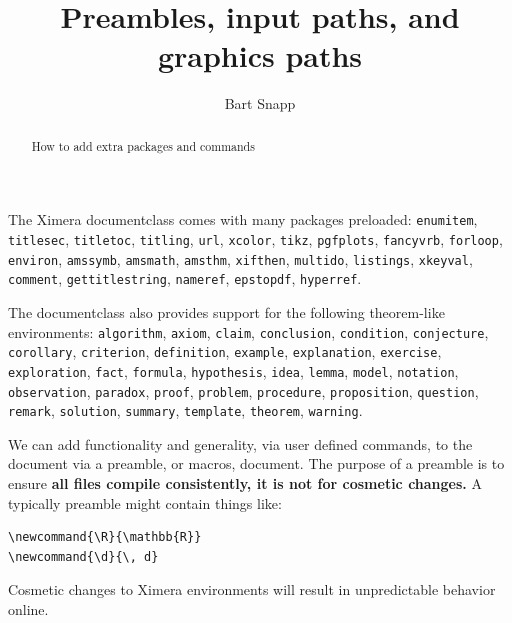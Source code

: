 \documentclass{ximera}
\title{Preambles, input paths, and graphics paths}
\author{Bart Snapp}
\begin{document}
\begin{abstract}
  How to add extra packages and commands
\end{abstract}
\maketitle



The Ximera documentclass comes with many packages preloaded:
\verb!enumitem!, 
\verb!titlesec!, 
\verb!titletoc!, 
\verb!titling!, 
\verb!url!, 
\verb!xcolor!, 
\verb!tikz!, 
\verb!pgfplots!, 
\verb!fancyvrb!, 
\verb!forloop!, 
\verb!environ!, 
\verb!amssymb!, 
\verb!amsmath!, 
\verb!amsthm!, 
\verb!xifthen!, 
\verb!multido!, 
\verb!listings!, 
\verb!xkeyval!, 
\verb!comment!, 
\verb!gettitlestring!, 
\verb!nameref!, 
\verb!epstopdf!, 
\verb!hyperref!.

The documentclass also provides support for the following theorem-like
environments:
\verb!algorithm!, \verb!axiom!, \verb!claim!, \verb!conclusion!,
\verb!condition!, \verb!conjecture!, \verb!corollary!, \verb!criterion!,
\verb!definition!, \verb!example!, \verb!explanation!, \verb!exercise!,
\verb!exploration!,
\verb!fact!, \verb!formula!, \verb!hypothesis!, \verb!idea!, \verb!lemma!,
\verb!model!,
\verb!notation!, \verb!observation!, \verb!paradox!, \verb!proof!, \verb!problem!,
\verb!procedure!,
\verb!proposition!, \verb!question!, \verb!remark!, \verb!solution!,
\verb!summary!, \verb!template!, \verb!theorem!, \verb!warning!.


We can add functionality and generality, via user defined commands, to the document via a preamble, or macros, document. 
The purpose of a preamble is to ensure \textbf{all files compile consistently,
  it is not for cosmetic changes.} A typically preamble might contain things
like:

\begin{verbatim}
\newcommand{\R}{\mathbb{R}}
\newcommand{\d}{\, d}
\end{verbatim}

\begin{warning}
  Cosmetic changes to Ximera environments will result in unpredictable behavior
  online.
\end{warning}
\end{document}
